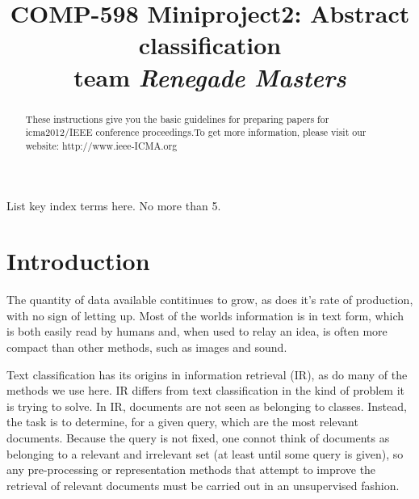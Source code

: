 \documentclass[conference,letterpaper]{IEEEtran}
\title{}
\begin{document}
\title{\huge 
	COMP-598 Miniproject2: Abstract classification\\
	team \textit{Renegade Masters}
}

\author{
%
}
\maketitle
\begin{abstract}
These instructions give you the basic guidelines for preparing
papers for icma2012/IEEE conference proceedings.To get more information,
please visit our website: http://www.ieee-ICMA.org
\\
\end{abstract}

\begin{keywords}
List key index terms here. No more than 5.
\end{keywords}

\section{Introduction}
The quantity of data available contitinues to grow, as does it's rate of 
production, with no sign of letting up.  Most of the worlds information is
in text form, which is both easily read by humans and, when used to relay
an idea, is often more compact than other methods, such as images and 
sound.

Text classification has its origins in information retrieval (IR), as do 
many of the methods we use here.  IR differs from text classification in the
kind of problem it is trying to solve.  In IR, documents are not seen as 
belonging to classes.  Instead, the task is to determine, for a given 
query, which are the most relevant documents.  Because the query is not
fixed, one connot think of documents as belonging to a relevant and 
irrelevant set (at least until some query is given), so any pre-processing
or representation methods that attempt to improve the retrieval of relevant 
documents must be carried out in an unsupervised fashion.
\end{document}
